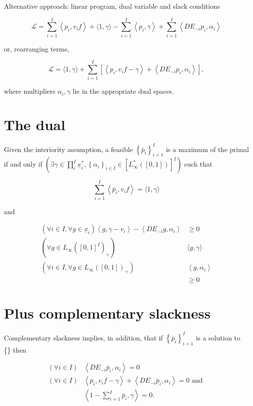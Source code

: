 \documentclass[10pt]{article}
\begin{document}
Alternative approach: linear program, dual variable and slack conditions

$$
\mathcal{L}=\sum_{i=1}^{I}\left\langle p_{i}, v_{i} f\right\rangle+\langle 1, \gamma\rangle-\sum_{i=1}^{I}\left\langle p_{i}, \gamma\right\rangle+\sum_{i=1}^{I}\left\langle D E_{-i} p_{i}, \alpha_{i}\right\rangle
$$

or, rearranging terms,

$$
\mathcal{L}=\langle 1, \gamma\rangle+\sum_{i=1}^{I}\left[\left\langle p_{i}, v_{i} f-\gamma\right\rangle+\left\langle D E_{-i} p_{i}, \alpha_{i}\right\rangle\right],
$$

where multipliers $\alpha_{i}, \gamma$ lie in the appropriate dual spaces.

\section*{The dual}
Given the interiority assumption, a feasible $\left\{\bar{p}_{i}\right\}_{i=1}^{I}$ is a maximum of the primal if and only if $\left(\exists \gamma \in \prod_{i}^{I} \underline{x}_{i}^{*},\left\{\alpha_{i}\right\}_{i \in I} \in\left[L_{\infty}^{*}([0,1])\right]^{I}\right)$ such that

$$
\sum_{i=1}^{I}\left\langle\bar{p}_{i}, v_{i} f\right\rangle=\langle 1, \gamma\rangle
$$

and

$$
\begin{aligned}
\left(\forall i \in I, \forall g \in \underline{x}_{i}\right)\left\langle g, \gamma-v_{i}\right\rangle-\left\langle D E_{-i} g, \alpha_{i}\right\rangle & \geq 0 \\
\left(\forall g \in L_{\infty}\left([0,1]^{I}\right)_{+}\right) & \langle g, \gamma\rangle \\
\left(\forall i \in I, \forall g \in L_{\infty}([0,1])_{+}\right) & \left\langle g, \alpha_{i}\right\rangle \\
& \geq 0
\end{aligned}
$$

\section*{Plus complementary slackness}
Complementary slackness implies, in addition, that if $\left\{\bar{p}_{i}\right\}_{i=1}^{I}$ is a solution to \{\} then

$$
\begin{array}{ll}
(\forall i \in I) & \left\langle D E_{-i} \bar{p}_{i}, \alpha_{i}\right\rangle=0 \\
(\forall i \in I) & \left\langle\bar{p}_{i}, v_{i} f-\gamma\right\rangle+\left\langle D E_{-i} \bar{p}_{i}, \alpha_{i}\right\rangle=0 \text { and } \\
& \left\langle 1-\sum_{i=1}^{I} \bar{p}_{i}, \gamma\right\rangle=0 .
\end{array}
$$
\end{document}
